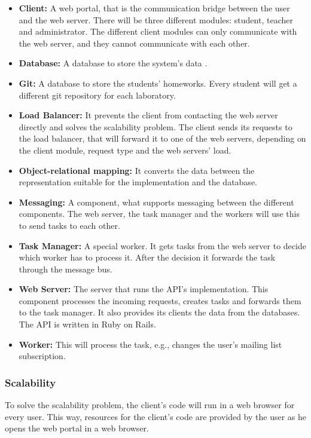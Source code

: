 \begin{itemize}
	\item \textbf{Client:} A web portal, that is the communication bridge between the user and the web server. There will be three different modules: student, teacher and administrator. The different client modules can only communicate with the web server, and they cannot communicate with each other.
	\item \textbf{Database:} A database to store the system's data . 
	\item \textbf{Git:} A database to store the students' homeworks. Every student will get a different git repository for each laboratory.
	\item \textbf{Load Balancer:} It prevents the client from contacting the web server directly and solves the scalability problem. The client sends its requests to the load balancer, that will forward it to one of the web servers, depending on the client module, request type and the web servers' load.
	\item \textbf{Object-relational mapping:} It converts the data between the representation suitable for the implementation and the database. 
	\item \textbf{Messaging:} A component, what supports messaging between the different components. The web server, the task manager and the workers will use this to send tasks to each other.
	\item \textbf{Task Manager:} A special worker. It gets tasks from the web server to decide which worker has to process it. After the decision it forwards the task through the message bus.
	\item \textbf{Web Server:} The server that runs the API's implementation. This component processes the incoming requests, creates tasks and forwards them to the task manager. It also provides its clients the data from the databases. The API is written in Ruby on Rails. 
	\item \textbf{Worker:} This will process the task, e.g., changes the user's mailing list subscription.
\end{itemize}

\subsubsection{Scalability}


To solve the scalability problem, the client's code will run in a web browser for every user. This way, resources for the client's code are provided by the user as he opens the web portal in a web browser.
 
